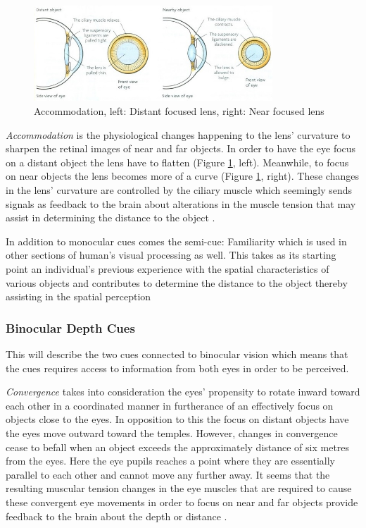 \begin{figure}[h!]
   \centering
   \includegraphics[width=0.8\textwidth]{figures/cue10.jpg}
   \caption{Accommodation, left: Distant focused lens, right: Near focused lens \cite{Biology2014}}\label{fig:cue10}
\end{figure}

\textit{Accommodation} is the physiological changes happening to the lens’ curvature to sharpen the retinal images of near and far objects. In order to have the eye focus on a distant object the lens have to flatten (Figure \ref{fig:cue10}, left). Meanwhile, to focus on near objects the lens becomes more of a curve (Figure \ref{fig:cue10}, right). These changes in the lens’ curvature are controlled by the ciliary muscle which seemingly sends signals as feedback to the brain about alterations in the muscle tension that may assist in determining the distance to the object \cite{Gale}.

In addition to monocular cues comes the semi-cue: Familiarity which is used in other sections of human’s visual processing as well. This takes as its starting point an individual’s previous experience with the spatial characteristics of various objects and contributes to determine the distance to the object thereby assisting in the spatial perception \cite{Gale}

\subsubsection{Binocular Depth Cues}
This will describe the two cues connected to binocular vision which means that the cues requires access to information from both eyes in order to be perceived.

\textit{Convergence} takes into consideration the eyes’ propensity to rotate inward toward each other in a coordinated manner in furtherance of an effectively focus on objects close to the eyes. In opposition to this the focus on distant objects have the eyes move outward toward the temples. However, changes in convergence cease to befall when an object exceeds the approximately distance of six metres from the eyes. Here the eye pupils reaches a point where they are essentially parallel to each other and cannot move any further away. It seems that the resulting muscular tension changes in the eye muscles that are required to cause these convergent eye movements in order to focus on near and far objects provide feedback to the brain about the depth or distance \cite{Gale}.


